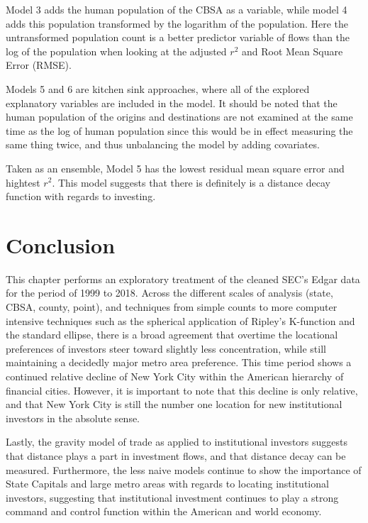 Model 3 adds the human population of the CBSA as a variable, while model 4 adds this population transformed by the logarithm of the population.  Here the untransformed population count is a better predictor variable of flows than the log of the population when looking at the adjusted $r^{2}$ and Root Mean Square Error (RMSE).  

Models 5 and 6 are kitchen sink approaches, where all of the explored explanatory variables are included in the model.  It should be noted that the human population of the origins and destinations are not examined at the same time as the log of human population since this would be in effect measuring the same thing twice, and thus unbalancing the model by adding covariates.  

Taken as an ensemble, Model 5 has the lowest residual mean square error and hightest $r^{2}$.  This model suggests that there is definitely is a distance decay function with regards to investing.   

\section{Conclusion}

This chapter performs an exploratory treatment of the cleaned SEC's Edgar data for the period of 1999 to 2018.   Across the different scales of analysis (state, CBSA, county, point), and techniques from simple counts to more computer intensive techniques such as the spherical application of Ripley's K-function and the standard ellipse, there is a broad agreement that overtime the locational preferences of investors steer toward slightly less concentration, while still maintaining a decidedly major metro area preference.  This time period shows a continued relative decline of New York City within the American hierarchy of financial cities.  However, it is important to note that this decline is only relative, and that New York City is still the number one location for new institutional investors in the absolute sense.  

Lastly, the gravity model of trade as applied to institutional investors suggests that distance plays a part in investment flows, and that distance decay can be measured.  Furthermore, the less naive models continue to show the importance of State Capitals and large metro areas with regards to locating institutional investors, suggesting that institutional investment continues to play a strong command and control function within the American and world economy. 
